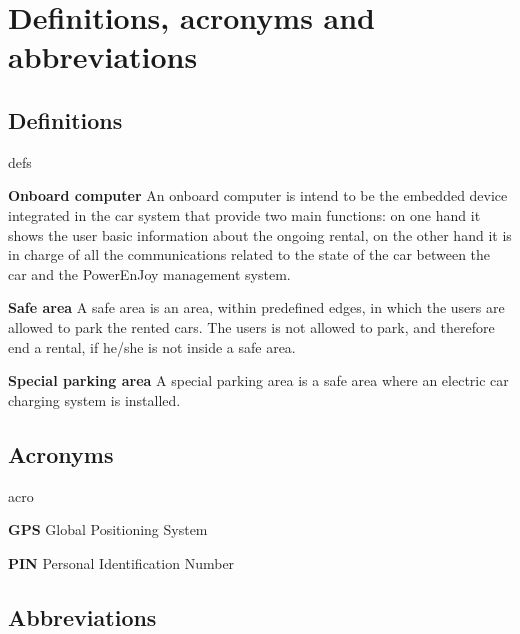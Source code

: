 \section{Definitions, acronyms and abbreviations}

\subsection{Definitions}
	\begin{labeling}{defs}
		\item[\textbf{Onboard computer}] An onboard computer is intend to be the embedded device integrated in the car system that provide two main functions: on one hand it shows the user basic information about the ongoing rental, on the other hand it is in charge of all the communications related to the state of the car between the car and the PowerEnJoy management system.
		\item[\textbf{Safe area}] A safe area is an area, within predefined edges, in which the users are allowed to park the rented cars. The users is not allowed to park, and therefore end a rental, if he/she is not inside a safe area.
		\item[\textbf{Special parking area}] A special parking area is a safe area where an electric car charging system is installed.
	\end{labeling}
\subsection{Acronyms}
	\begin{labeling}{acro}
		\item[\textbf{GPS}] Global Positioning System
		\item[\textbf{PIN}] Personal Identification Number
	\end{labeling}
\subsection{Abbreviations}
